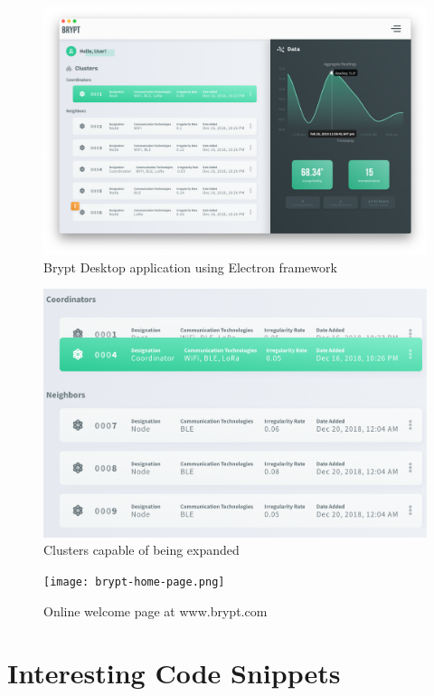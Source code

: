 \documentclass[tikz,a4paper,titlepage]{article}
\begin{document}
\begin{figure}[H]
  \centering
    \includegraphics[scale=.35]{dashboard-screen.png}
    \caption{Brypt Desktop application using Electron framework}
\end{figure}

\begin{figure}[H]
  \centering
    \includegraphics[scale=.5]{expanded-sub-cluster.png}
    \caption{Clusters capable of being expanded}
\end{figure}

\begin{figure}[H]
  \centering
    \texttt{[image: brypt-home-page.png]}
    \caption{Online welcome page at www.brypt.com}
\end{figure}

\section{Interesting Code Snippets}
\end{document}
